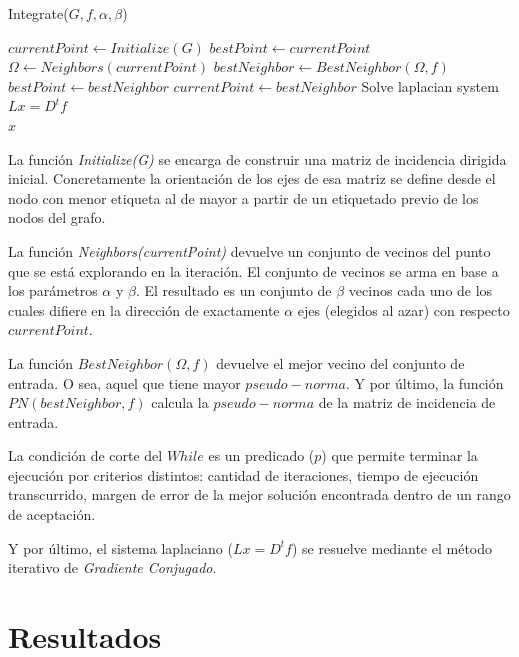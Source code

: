\documentclass[10pt, a4paper, twocolumn]{article} %
\begin{document}
\begin{algorithm}
    \caption{Integrate($G,f,\alpha,\beta$)}
	\begin{algorithmic}
		\State $currentPoint \gets Initialize(G)$
		\State $bestPoint \gets currentPoint$
			\State $\Omega \gets Neighbors(currentPoint)$
			\State $bestNeighbor \gets BestNeighbor(\Omega,f)$
				\State $bestPoint \gets bestNeighbor$
			\EndIf
			\State $currentPoint \gets bestNeighbor$
		\EndWhile
		\State Solve laplacian system $L x = D^t f$ \\
		\Return $x$
	\end{algorithmic}
	\label{alg:alg1}
\end{algorithm}

\newpage

La función \emph{Initialize(G)} se encarga de construir 
una matriz de incidencia dirigida inicial. Concretamente la orientación 
de los ejes de esa matriz se define desde el nodo con menor 
etiqueta al de mayor a partir de un etiquetado previo de los nodos del 
grafo. 

\smallskip

La función \emph{Neighbors(currentPoint)} devuelve un conjunto de 
vecinos del punto que se está explorando en la iteración. El conjunto 
de vecinos se arma en base a los parámetros $\alpha$ y $\beta$. El 
resultado es un conjunto de $\beta$ vecinos cada uno de los cuales 
difiere en la dirección de exactamente $\alpha$ ejes (elegidos al azar) 
con respecto $currentPoint$.

\smallskip

La función $BestNeighbor(\Omega,f)$ devuelve el mejor vecino del conjunto 
de entrada. O sea, aquel que tiene mayor $pseudo-norma$. Y por último, 
la función $PN(bestNeighbor,f)$ calcula la $pseudo-norma$ de la matriz 
de incidencia de entrada.

\smallskip

La condición de corte del $While$ es un predicado ($p$) que permite 
terminar la ejecución por criterios distintos: cantidad de iteraciones, 
tiempo de ejecución transcurrido, margen de error de la mejor solución 
encontrada dentro de un rango de aceptación.

\smallskip

Y por último, el sistema laplaciano ($Lx = D^t f$) se resuelve mediante 
el método iterativo de \emph{Gradiente Conjugado}.

\section{Resultados}
\end{document}
